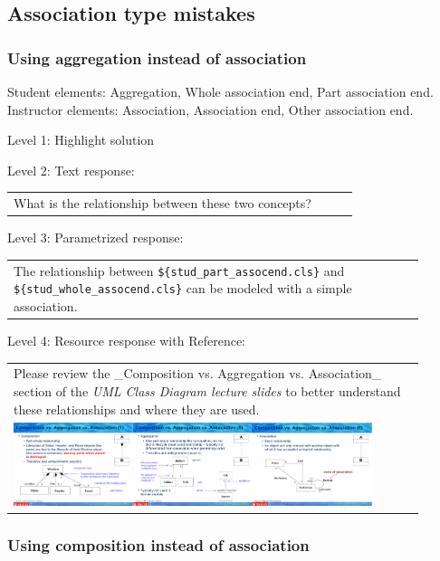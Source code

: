 \subsection{Association type mistakes}

\subsubsection{Using aggregation instead of association}

Student elements: Aggregation, Whole association end, Part association end. Instructor elements: Association, Association end, Other association end. \medskip

\noindent Level 1: Highlight solution  \medskip

\noindent Level 2: Text response: \medskip

\begin{tabular}{|p{0.9\linewidth}}
What is the relationship between these two concepts?
\end{tabular} \medskip

\noindent Level 3: Parametrized response: \medskip

\begin{tabular}{|p{0.9\linewidth}}
The relationship between \verb|${stud_part_assocend.cls}| and \verb|${stud_whole_assocend.cls}| can be modeled with a simple association.
\end{tabular} \medskip

\noindent Level 4: Resource response with Reference: \medskip

\begin{tabular}{|p{0.9\linewidth}}
Please review the _Composition vs. Aggregation vs. Association_ section of 
the \textit{UML Class Diagram lecture slides} to 
better understand these relationships and where they are used.

\\
\includegraphics[width=0.9\textwidth]{images/composition_aggregation_association.png}
\end{tabular} \medskip


\subsubsection{Using composition instead of association}

